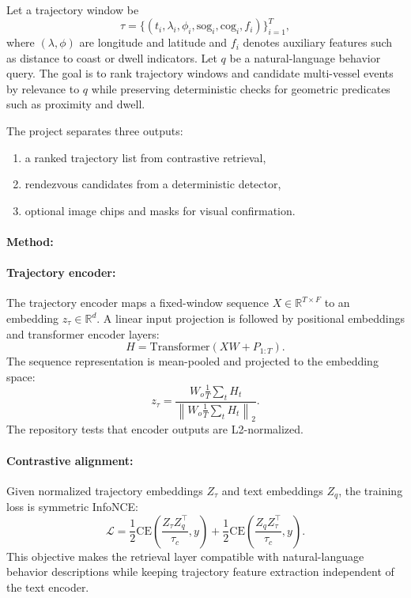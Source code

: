 \documentclass{article}
\begin{document}
Let a trajectory window be
\begin{equation}
  \tau = \{(t_i,\lambda_i,\phi_i,\text{sog}_i,\text{cog}_i,f_i)\}_{i=1}^{T},
\end{equation}
where $(\lambda,\phi)$ are longitude and latitude and $f_i$ denotes auxiliary features such as distance to coast or dwell indicators. Let $q$ be a natural-language behavior query. The goal is to rank trajectory windows and candidate multi-vessel events by relevance to $q$ while preserving deterministic checks for geometric predicates such as proximity and dwell.

The project separates three outputs:
\begin{enumerate}
  \item a ranked trajectory list from contrastive retrieval,
  \item rendezvous candidates from a deterministic detector,
  \item optional image chips and masks for visual confirmation.
\end{enumerate}

\paragraph{Method:}

\paragraph{Trajectory encoder:}

The trajectory encoder maps a fixed-window sequence $X\in\mathbb{R}^{T\times F}$ to an embedding $z_{\tau}\in\mathbb{R}^d$. A linear input projection is followed by positional embeddings and transformer encoder layers:
\begin{equation}
  H = \text{Transformer}(XW + P_{1:T}).
\end{equation}
The sequence representation is mean-pooled and projected to the embedding space:
\begin{equation}
  z_{\tau} = \frac{W_o \frac{1}{T}\sum_t H_t}{\left\|W_o \frac{1}{T}\sum_t H_t\right\|_2}.
\end{equation}
The repository tests that encoder outputs are L2-normalized.

\paragraph{Contrastive alignment:}

Given normalized trajectory embeddings $Z_{\tau}$ and text embeddings $Z_q$, the training loss is symmetric InfoNCE:
\begin{equation}
  \mathcal{L} =
  \frac{1}{2}\text{CE}\left(\frac{Z_{\tau}Z_q^\top}{\tau_c}, y\right)
  +\frac{1}{2}\text{CE}\left(\frac{Z_qZ_{\tau}^\top}{\tau_c}, y\right).
\end{equation}
This objective makes the retrieval layer compatible with natural-language behavior descriptions while keeping trajectory feature extraction independent of the text encoder.
\end{document}
